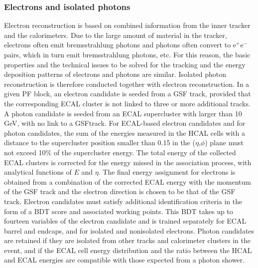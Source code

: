 \subsubsection{Electrons and isolated photons} Electron reconstruction is based on combined information from the inner tracker and the calorimeters. Due to the large amount of material in the tracker, electrons often emit bremsstrahlung photons and photons often convert to e$^+$e$^-$ pairs, which in turn emit bremsstrahlung photons, etc.  For this reason, the basic properties and the technical issues to be solved for the tracking and the energy deposition patterns of electrons and photons are similar. Isolated photon reconstruction is therefore conducted together with electron reconstruction. In a given PF block, an electron candidate is seeded from a GSF track, provided that the corresponding ECAL cluster is not linked to three or more additional tracks. A photon candidate is seeded from an ECAL supercluster with \et larger than 10 GeV, with no link to a GSFtrack. For ECAL-based electron candidates and for photon candidates, the sum of the energies measured in the HCAL cells with a distance to the supercluster position smaller than 0.15 in the ($\eta$,$\phi$) plane must not exceed 10$\%$ of the supercluster energy. The total energy of the collected ECAL clusters is corrected for the energy missed in the association process, with analytical functions of $E$ and $\eta$. The final energy assignment for electrons is obtained from a combination of the corrected ECAL energy with the momentum of the GSF track and the electron direction is chosen to be that of the GSF track. Electron candidates must satisfy additional identification criteria in the form of a BDT score and associated working points. This BDT takes up to fourteen variables of the electron candidate and is trained separately for ECAL barrel and endcaps, and for isolated and nonisolated electrons. Photon candidates are retained if they are isolated from other tracks and calorimeter clusters in the event, and if the ECAL cell energy distribution and the ratio between the HCAL and ECAL energies are compatible with those expected from a photon shower. 


